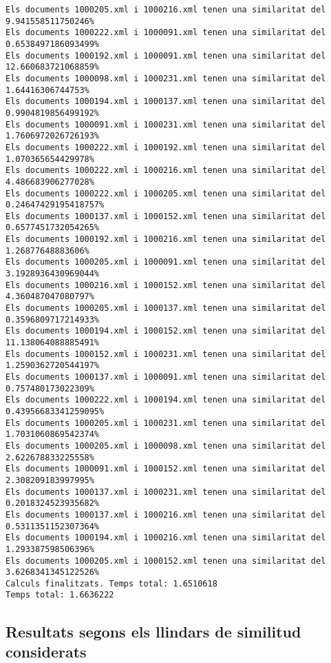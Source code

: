\documentclass{report}
\begin{document}
\begin{verbatim}
Els documents 1000205.xml i 1000216.xml tenen una similaritat del 9.941558511750246%
Els documents 1000222.xml i 1000091.xml tenen una similaritat del 0.6538497186093499%
Els documents 1000192.xml i 1000091.xml tenen una similaritat del 12.660683721068859%
Els documents 1000098.xml i 1000231.xml tenen una similaritat del 1.64416306744753%
Els documents 1000194.xml i 1000137.xml tenen una similaritat del 0.9904819856499192%
Els documents 1000091.xml i 1000231.xml tenen una similaritat del 1.7606972026726193%
Els documents 1000222.xml i 1000192.xml tenen una similaritat del 1.070365654429978%
Els documents 1000222.xml i 1000216.xml tenen una similaritat del 4.486683906277028%
Els documents 1000222.xml i 1000205.xml tenen una similaritat del 0.24647429195418757%
Els documents 1000137.xml i 1000152.xml tenen una similaritat del 0.6577451732054265%
Els documents 1000192.xml i 1000216.xml tenen una similaritat del 1.26877648883606%
Els documents 1000205.xml i 1000091.xml tenen una similaritat del 3.1928936430969044%
Els documents 1000216.xml i 1000152.xml tenen una similaritat del 4.360487047080797%
Els documents 1000205.xml i 1000137.xml tenen una similaritat del 0.3596809717214933%
Els documents 1000194.xml i 1000152.xml tenen una similaritat del 11.138064088885491%
Els documents 1000152.xml i 1000231.xml tenen una similaritat del 1.2590362720544197%
Els documents 1000137.xml i 1000091.xml tenen una similaritat del 0.757480173022309%
Els documents 1000222.xml i 1000194.xml tenen una similaritat del 0.43956683341259095%
Els documents 1000205.xml i 1000231.xml tenen una similaritat del 1.7031060869542374%
Els documents 1000205.xml i 1000098.xml tenen una similaritat del 2.622678833225558%
Els documents 1000091.xml i 1000152.xml tenen una similaritat del 2.308209183997995%
Els documents 1000137.xml i 1000231.xml tenen una similaritat del 0.2018324523935682%
Els documents 1000137.xml i 1000216.xml tenen una similaritat del 0.5311351152307364%
Els documents 1000194.xml i 1000216.xml tenen una similaritat del 1.293387598506396%
Els documents 1000205.xml i 1000152.xml tenen una similaritat del 3.6268341345122526%
Calculs finalitzats. Temps total: 1.6510618
Temps total: 1.6636222

\end{verbatim}

\subsection{Resultats segons els llindars de similitud considerats}
\end{document}
